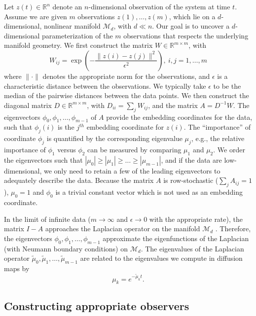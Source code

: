 \documentclass[preprint]{elsarticle}
\begin{document}
Let $z(t) \in \mathbb{R}^n$ denote an $n$-dimensional observation of the system at time $t$. 
%
Assume we are given $m$ observations $z(1), \dots, z(m)$, which lie on a $d$-dimensional, nonlinear manifold $\mathcal{M}_d$, with $d \ll n$. 
%
Our goal is to uncover a $d$-dimensional parameterization of the $m$ observations that respects the underlying manifold geometry.
%
We first construct the matrix $W \in \mathbb{R}^{m \times m}$, with
\begin{equation} \label{eq:W}
W_{ij} = \exp \left( -\frac{\|z(i) - z(j) \|^2}{\epsilon^2} \right), \ i,j=1,\ldots,m
\end{equation}
where $\| \cdot \|$ denotes the appropriate norm for the observations, and $\epsilon$ is a characteristic distance between the observations. 
%
We typically take $\epsilon$ to be the median of the pairwise distances between the data points.
%
We then construct the diagonal matrix $D \in \mathbb{R}^{m \times m}$, with $D_{ii} = \sum_j W_{ij}$, and the matrix $A  = D^{-1} W.$
%
The eigenvectors $\phi_0, \phi_1, \dots, \phi_{m-1}$ of $A$ provide the embedding coordinates for the data, such that
$\phi_{j}(i)$ is the $j^{th}$ embedding coordinate for $z(i)$.
%
The ``importance'' of coordinate $\phi_j$ is quantified by the corresponding eigenvalue $\mu_j$, e.g., the relative importance of $\phi_1$ versus $\phi_2$ can be measured by comparing $\mu_1$ and $\mu_2$.
%
We order the eigenvectors such that $|\mu_0| \ge |\mu_1| \ge \dots \ge |\mu_{m-1}|$, and if the data are low-dimensional, we only need to retain a few of the leading eigenvectors to adequately describe the data.
%
Because the matrix $A$ is row-stochastic ($\sum_j A_{ij} = 1$),  $\mu_0 = 1$ and $\phi_0$ is a trivial constant vector which is not used as an embedding coordinate.

In the limit of infinite data ($m \rightarrow \infty$ and $\epsilon \rightarrow 0$ with the appropriate rate), the matrix $I-A$ approaches the Laplacian operator on the manifold $\mathcal{M}_d$ \cite{...}. 
%
Therefore, the eigenvectors $\phi_0, \phi_1, \dots, \phi_{m-1}$ approximate the eigenfunctions of the Laplacian (with Neumann boundary conditions) on $\mathcal{M}_d$.
%
The eigenvalues of the Laplacian operator $\tilde{\mu}_0, \tilde{\mu}_1, \dots, \tilde{\mu}_{m-1}$ are related to the eigenvalues we compute in diffusion maps by 
\begin{equation} \label{eq:evals_relationship}
\mu_k = e^{-\tilde{\mu}_k t}.
\end{equation}

\subsection{Constructing appropriate observers}
\end{document}
